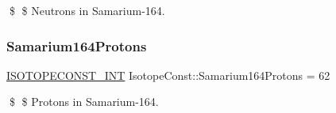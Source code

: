 \$ \$ Neutrons in Samarium-\/164. \mbox{\label{group___isotope_const-_samarium-_sm164_ga32c3745a017ecceb1304cf96a481da9b}} 
\subsubsection{\texorpdfstring{Samarium164\+Protons}{Samarium164Protons}}
{\footnotesize\ttfamily \mbox{\hyperlink{group___isotope_const-_macros_ga5f18360b3e99483a35c32d789e62621c}{I\+S\+O\+T\+O\+P\+E\+C\+O\+N\+S\+T\+\_\+\+I\+NT}} Isotope\+Const\+::\+Samarium164\+Protons = 62}

\$ \$ Protons in Samarium-\/164. 